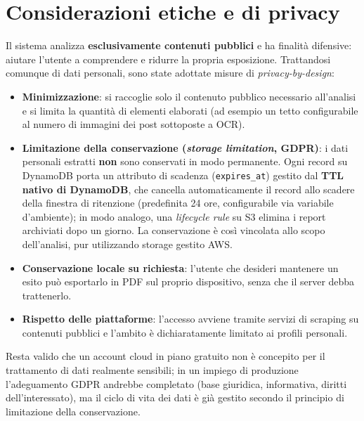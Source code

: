 \documentclass[11pt,a4paper]{article}
\begin{document}
\section{Considerazioni etiche e di privacy}
Il sistema analizza \textbf{esclusivamente contenuti pubblici} e ha finalità
difensive: aiutare l'utente a comprendere e ridurre la propria esposizione. Trattandosi
comunque di dati personali, sono state adottate misure di \emph{privacy-by-design}:
\begin{itemize}[nosep]
  \item \textbf{Minimizzazione}: si raccoglie solo il contenuto pubblico necessario
        all'analisi e si limita la quantità di elementi elaborati (ad esempio un tetto
        configurabile al numero di immagini dei post sottoposte a OCR).
  \item \textbf{Limitazione della conservazione (\emph{storage limitation}, GDPR)}: i
        dati personali estratti \textbf{non} sono conservati in modo permanente. Ogni
        record su DynamoDB porta un attributo di scadenza (\texttt{expires\_at}) gestito
        dal \textbf{TTL nativo di DynamoDB}, che cancella automaticamente il record allo
        scadere della finestra di ritenzione (predefinita 24 ore, configurabile via
        variabile d'ambiente); in modo analogo, una \emph{lifecycle rule} su S3 elimina i
        report archiviati dopo un giorno. La conservazione è così vincolata allo scopo
        dell'analisi, pur utilizzando storage gestito AWS.
  \item \textbf{Conservazione locale su richiesta}: l'utente che desideri mantenere un
        esito può esportarlo in PDF sul proprio dispositivo, senza che il server debba
        trattenerlo.
  \item \textbf{Rispetto delle piattaforme}: l'accesso avviene tramite servizi di
        scraping su contenuti pubblici e l'ambito è dichiaratamente limitato ai profili
        personali.
\end{itemize}
Resta valido che un account cloud in piano gratuito non è concepito per il trattamento
di dati realmente sensibili; in un impiego di produzione l'adeguamento GDPR andrebbe
completato (base giuridica, informativa, diritti dell'interessato), ma il ciclo di vita
dei dati è già gestito secondo il principio di limitazione della conservazione.

\end{document}
